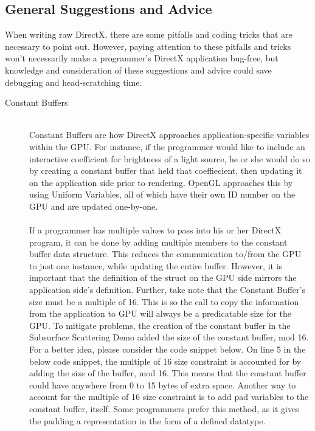 \documentclass[a4paper, 12pt]{article}
\begin{document}
\subsection{General Suggestions and Advice}

When writing raw DirectX, there are some pitfalls and coding tricks that are
necessary to point out. However, paying attention to these pitfalls and tricks
won't necessarily make a programmer's DirectX application bug-free, but
knowledge and consideration of these suggestions and advice could save
debugging and head-scratching time.

\begin{description}

\item[Constant Buffers] \hfill \\

Constant Buffers are how DirectX approaches application-specific variables
within the GPU. For instance, if the programmer would like to include an
interactive coefficient for brightness of a light source, he or she would do
so by creating a constant buffer that held that coeffiecient, then updating it
on the application side prior to rendering. OpenGL approaches this by using
Uniform Variables, all of which have their own ID number on the GPU and are
updated one-by-one. \\ \\ If a programmer has multiple values to pass into his
or her DirectX program, it can be done by adding multiple members to the
constant buffer data structure. This reduces the communication to/from the GPU
to just one instance, while updating the entire buffer. However, it is
important that the definition of the struct on the GPU side mirrors the
application side's definition. Further, take note that the Constant Buffer's
size must be a multiple of 16. This is so the call to copy the information
from the application to GPU will always be a predicatable size for the GPU. To
mitigate problems, the creation of the constant buffer in the Subsurface
Scattering Demo added the size of the constant buffer, mod 16. For a better
idea, please consider the code snippet below. On line 5 in the below code
snippet, the multiple of 16 size constraint is accounted for by adding the
size of the buffer, mod 16. This means that the constant buffer could have
anywhere from 0 to 15 bytes of extra space. Another way to account for the
multiple of 16 size constraint is to add pad variables to the constant buffer,
itself. Some programmers prefer this method, as it gives the padding a
representation in the form of a defined datatype.


\end{description}
\end{document}
